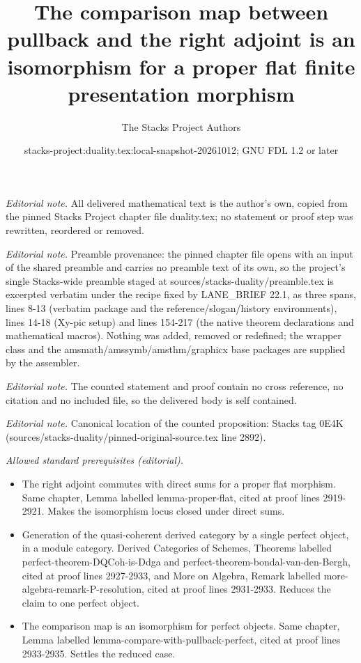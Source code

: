 \documentclass[10pt,a4paper]{amsart}
\title{The comparison map between pullback and the right adjoint is an isomorphism for a proper flat finite presentation morphism}
\author{The Stacks Project Authors}
\date{stacks-project:duality.tex:local-snapshot-20261012; GNU FDL 1.2 or later}
\theoremstyle{plain}
\theoremstyle{definition}
\theoremstyle{remark}
\numberwithin{equation}{subsection}
\begin{document}
\maketitle
\noindent\textit{Editorial note.} All delivered mathematical text is the author's own, copied from the pinned Stacks Project chapter file duality.tex; no statement or proof step was rewritten, reordered or removed.\par\medskip
\noindent\textit{Editorial note.} Preamble provenance: the pinned chapter file opens with an input of the shared preamble and carries no preamble text of its own, so the project's single Stacks-wide preamble staged at sources/stacks-duality/preamble.tex is excerpted verbatim under the recipe fixed by LANE\_BRIEF 22.1, as three spans, lines 8-13 (verbatim package and the reference/slogan/history environments), lines 14-18 (Xy-pic setup) and lines 154-217 (the native theorem declarations and mathematical macros). Nothing was added, removed or redefined; the wrapper class and the amsmath/amssymb/amsthm/graphicx base packages are supplied by the assembler.\par\medskip
\noindent\textit{Editorial note.} The counted statement and proof contain no cross reference, no citation and no included file, so the delivered body is self contained.\par\medskip
\noindent\textit{Editorial note.} Canonical location of the counted proposition: Stacks tag 0E4K (sources/stacks-duality/pinned-original-source.tex line 2892).\par\medskip
\noindent\textit{Allowed standard prerequisites (editorial).}\begin{itemize}
\item The right adjoint commutes with direct sums for a proper flat morphism. Same chapter, Lemma labelled lemma-proper-flat, cited at proof lines 2919-2921. Makes the isomorphism locus closed under direct sums.
\item Generation of the quasi-coherent derived category by a single perfect object, in a module category. Derived Categories of Schemes, Theorems labelled perfect-theorem-DQCoh-is-Ddga and perfect-theorem-bondal-van-den-Bergh, cited at proof lines 2927-2933, and More on Algebra, Remark labelled more-algebra-remark-P-resolution, cited at proof lines 2931-2933. Reduces the claim to one perfect object.
\item The comparison map is an isomorphism for perfect objects. Same chapter, Lemma labelled lemma-compare-with-pullback-perfect, cited at proof lines 2933-2935. Settles the reduced case.
\end{itemize}\medskip
\end{document}
